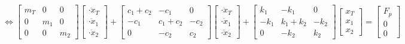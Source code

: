    \begin{equation*}
    \Longleftrightarrow
    \begin{bmatrix}
        m_T & 0 & 0 \\
        0 & m_1 & 0 \\
        0 & 0 & m_2
    \end{bmatrix}
    \begin{bmatrix}
        \cdot \ddot{x}_T \\ \cdot \ddot{x}_1 \\ \cdot \ddot{x}_2
    \end{bmatrix}
    +
    \begin{bmatrix}
        c_1 + c_2 & -c_1 & 0 \\
        -c_1 & c_1 + c_2 & -c_2 \\
        0 & -c_2 & c_2
    \end{bmatrix}
    \begin{bmatrix}
        \cdot \ddot{x}_T \\ \cdot \ddot{x}_1 \\ \cdot \ddot{x}_2
    \end{bmatrix}
    +
    \begin{bmatrix}
        k_1 & -k_1 & 0 \\
        -k_1 & k_1 + k_2 & -k_2 \\
        0 & -k_2 & k_2
    \end{bmatrix}
    \begin{bmatrix}
        x_T \\ x_1 \\ x_2
    \end{bmatrix}
    =
    \begin{bmatrix}
        F_p \\ 0 \\ 0
    \end{bmatrix}
    \end{equation*}